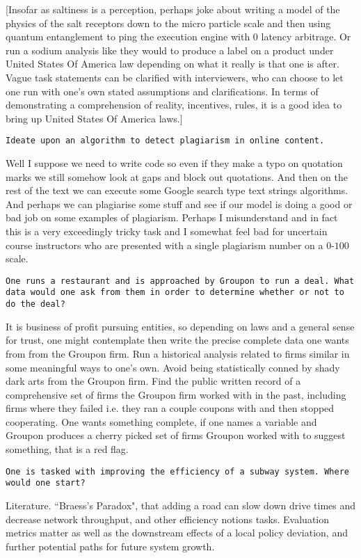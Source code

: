 [Insofar as saltiness is a perception, perhaps joke about writing a model of the physics of the salt receptors down to the micro particle scale and then using quantum entanglement to ping the execution engine with $0$ latency arbitrage. Or run a sodium analysis like they would to produce a label on a product under United States Of America law depending on what it really is that one is after. Vague task statements can be clarified with interviewers, who can choose to let one run with one's own stated assumptions and clarifications. In terms of demonstrating a comprehension of reality, incentives, rules, it is a good idea to bring up United States Of America laws.]

\texttt{Ideate upon an algorithm to detect plagiarism in online content.}

Well I suppose we need to write code so even if they make a typo on quotation marks we still somehow look at gaps and block out quotations. And then on the rest of the text we can execute some Google search type text strings algorithms. And perhaps we can plagiarise some stuff and see if our model is doing a good or bad job on some examples of plagiarism. Perhaps I misunderstand and in fact this is a very exceedingly tricky task and I somewhat feel bad for uncertain course instructors who are presented with a single plagiarism number on a $0$-$100$ scale.

\texttt{One runs a restaurant and is approached by Groupon to run a deal. What data would one ask from them in order to determine whether or not to do the deal?}

It is business of profit pursuing entities, so depending on laws and a general sense for trust, one might contemplate then write the precise complete data one wants from from the Groupon firm. Run a historical analysis related to firms similar in some meaningful ways to one's own. Avoid being statistically conned by shady dark arts from the Groupon firm. Find the public written record of a comprehensive set of firms the Groupon firm worked with in the past, including firms where they failed i.e. they ran a couple coupons with and then stopped cooperating. One wants something complete, if one names a variable and Groupon produces a cherry picked set of firms Groupon worked with to suggest something, that is a red flag.

\texttt{One is tasked with improving the efficiency of a subway system. Where would one start?}

Literature. ``Braess's Paradox", that adding a road can slow down drive times and decrease network throughput, and other efficiency notions tasks. Evaluation metrics matter as well as the downstream effects of a local policy deviation, and further potential paths for future system growth.

